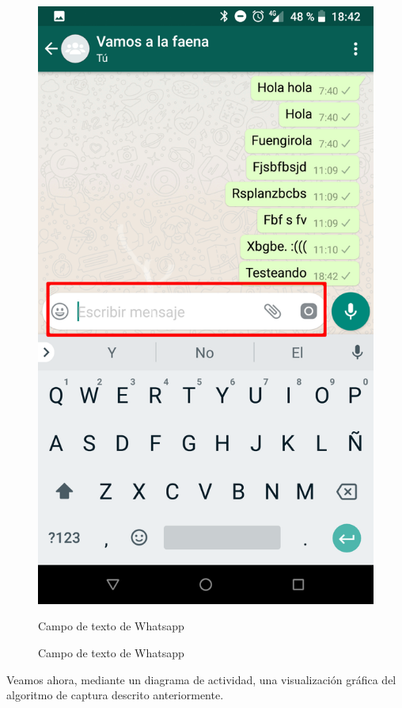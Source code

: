 \documentclass[12pt,a4paper,oneside]{book} %
\begin{document}
\begin{itemize}
\begin{figure}[H]
\begin{center}
     	\includegraphics[scale=0.2]{pictures/IRL/whatsapp/whatsapp_text.png}
	    	\caption{Campo de texto de Whatsapp}{Campo de texto de Whatsapp}
    	\label{fig:Whatsapp editText widget}
	\end{center}
\end{figure}
\end{itemize}
Veamos ahora, mediante un diagrama de actividad, una visualización gráfica del algoritmo de captura descrito anteriormente. 
\end{document}
